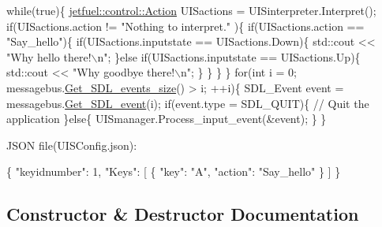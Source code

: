 \begin{DoxyCode}
\textcolor{keywordflow}{while}(\textcolor{keyword}{true})\{
    \hyperlink{structjetfuel_1_1control_1_1Action}{jetfuel::control::Action} UISactions =
    UISinterpreter.Interpret();
    \textcolor{keywordflow}{if}(UISactions.action != \textcolor{stringliteral}{"Nothing to interpret."}
       )\{
            \textcolor{keywordflow}{if}(UISactions.action == \textcolor{stringliteral}{"Say\_hello"})\{
                \textcolor{keywordflow}{if}(UISactions.inputstate ==
                  UISactions.Down)\{
                   std::cout << \textcolor{stringliteral}{"Why hello there!\(\backslash\)n"};
                \}\textcolor{keywordflow}{else} \textcolor{keywordflow}{if}(UISactions.inputstate ==
                         UISactions.Up)\{
                    std::cout
                    << \textcolor{stringliteral}{"Why goodbye there!\(\backslash\)n"};
                \}
            \}
        \}
\}
\textcolor{keywordflow}{for}(\textcolor{keywordtype}{int} i = 0; messagebus.\hyperlink{classjetfuel_1_1core_1_1Message__bus_aa363b50d4ba99ae86430b5f12610fd39}{Get\_SDL\_events\_size}() > i; ++i)\{
    SDL\_Event \textcolor{keyword}{event} = messagebus.\hyperlink{classjetfuel_1_1core_1_1Message__bus_ab80c8b51aca00ad4942ee2114fdf2fec}{Get\_SDL\_event}(i);
    \textcolor{keywordflow}{if}(event.type = SDL\_QUIT)\{
        \textcolor{comment}{// Quit the application}
    \}\textcolor{keywordflow}{else}\{
        UISmanager.Process\_input\_event(&event);
    \}
\}
\end{DoxyCode}


J\+S\+ON file(U\+I\+S\+Config.\+json)\+: 
\begin{DoxyCode}
\{
    \textcolor{stringliteral}{"keyidnumber"}: 1,
    \textcolor{stringliteral}{"Keys"}: [
      \{
        \textcolor{stringliteral}{"key"}: \textcolor{stringliteral}{"A"},
        \textcolor{stringliteral}{"action"}: \textcolor{stringliteral}{"Say\_hello"}
      \}
    ]
\}
\end{DoxyCode}
 

\subsection{Constructor \& Destructor Documentation}
\mbox{\label{classjetfuel_1_1control_1_1UIS__interpreter_acd4a4c57e4f2413d68d494f8786fea64}} 
